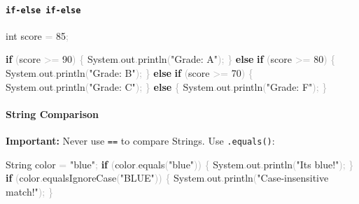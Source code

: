 \documentclass[
  justified,
  openright,
]{tufte-book}
\let\subsection\paragraph
\let\paragraph\paragraph
\newcommand{\KeywordTok}[1]{\textcolor{CodeKeyword}{\textbf{#1}}}  %
\newcommand{\StringTok}[1]{\textcolor{CodeString}{#1}}              %
\newcommand{\CodeNumTok}[1]{\textcolor{CodeNumber}{#1}}             %
\newcommand{\CodeFuncTok}[1]{\textcolor{CodeKeyword}{#1}}           %
\newcommand{\CodeTypeTok}[1]{\textcolor{CodeType}{#1}}              %
\newcommand{\OperatorTok}[1]{\textcolor{DarkGray}{#1}}              %
\newenvironment{Shaded}{%
  \begin{mdframed}[style=TufteCode]%
}{%
  \end{mdframed}%
}
\let\subsection\paragraph
\let\paragraph\paragraph
\begin{document}
\subsection{\texorpdfstring{\texttt{if-else\ if-else}}{if-else if-else}}\label{if-else-if-else-1}

\begin{Shaded}
\begin{Highlighting}[]
\CodeTypeTok{int} score \OperatorTok{=} \CodeNumTok{85}\OperatorTok{;}
 
\KeywordTok{if} \OperatorTok{(}score \OperatorTok{\textgreater{}=} \CodeNumTok{90}\OperatorTok{)} \OperatorTok{\{}
    System\OperatorTok{.}\CodeFuncTok{out}\OperatorTok{.}\CodeFuncTok{println}\OperatorTok{(}\StringTok{"Grade: A"}\OperatorTok{);}
\OperatorTok{\}} \KeywordTok{else} \KeywordTok{if} \OperatorTok{(}score \OperatorTok{\textgreater{}=} \CodeNumTok{80}\OperatorTok{)} \OperatorTok{\{}
    System\OperatorTok{.}\CodeFuncTok{out}\OperatorTok{.}\CodeFuncTok{println}\OperatorTok{(}\StringTok{"Grade: B"}\OperatorTok{);}
\OperatorTok{\}} \KeywordTok{else} \KeywordTok{if} \OperatorTok{(}score \OperatorTok{\textgreater{}=} \CodeNumTok{70}\OperatorTok{)} \OperatorTok{\{}
    System\OperatorTok{.}\CodeFuncTok{out}\OperatorTok{.}\CodeFuncTok{println}\OperatorTok{(}\StringTok{"Grade: C"}\OperatorTok{);}
\OperatorTok{\}} \KeywordTok{else} \OperatorTok{\{}
    System\OperatorTok{.}\CodeFuncTok{out}\OperatorTok{.}\CodeFuncTok{println}\OperatorTok{(}\StringTok{"Grade: F"}\OperatorTok{);}
\OperatorTok{\}}
\end{Highlighting}
\end{Shaded}

\subsection{String Comparison}\label{string-comparison}

\textbf{Important:} Never use \texttt{==} to compare Strings. Use
\texttt{.equals()}:

\begin{Shaded}
\begin{Highlighting}[]
String color \OperatorTok{=} \StringTok{"blue"}\OperatorTok{;}
\KeywordTok{if} \OperatorTok{(}color\OperatorTok{.}\CodeFuncTok{equals}\OperatorTok{(}\StringTok{"blue"}\OperatorTok{))} \OperatorTok{\{}
    System\OperatorTok{.}\CodeFuncTok{out}\OperatorTok{.}\CodeFuncTok{println}\OperatorTok{(}\StringTok{"It\textquotesingle{}s blue!"}\OperatorTok{);}
\OperatorTok{\}}
\KeywordTok{if} \OperatorTok{(}color\OperatorTok{.}\CodeFuncTok{equalsIgnoreCase}\OperatorTok{(}\StringTok{"BLUE"}\OperatorTok{))} \OperatorTok{\{}
    System\OperatorTok{.}\CodeFuncTok{out}\OperatorTok{.}\CodeFuncTok{println}\OperatorTok{(}\StringTok{"Case{-}insensitive match!"}\OperatorTok{);}
\OperatorTok{\}}
\end{Highlighting}
\end{Shaded}
\end{document}
